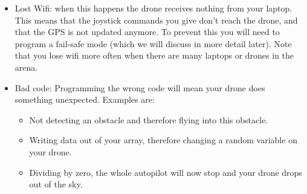 \documentclass{article}
\begin{document}
\begin{itemize}
\item Lost Wifi: when this happens the drone receives nothing from your laptop. This means that the joystick commands you give don't reach the drone, and that the GPS is not updated anymore. To prevent this you will need to program a fail-safe mode (which we will discuss in more detail later). Note that you lose wifi more often when there are many laptops or drones in the arena. 
\item Bad code: Programming the wrong code will mean your drone does something unexpected. Examples are: 
\begin{itemize}
	\item Not detecting an obstacle and therefore flying into this obstacle. 
	\item Writing data out of your array, therefore changing a random variable on your drone. 
	\item Dividing by zero, the whole autopilot will now stop and your drone drops out of the sky. 
\end{itemize}
\end{itemize}
\end{document}
